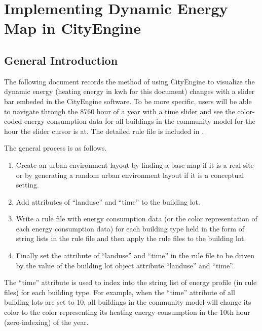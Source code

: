 \chapter{Implementing Dynamic Energy Map in
  CityEngine} %

\label{AppendixA} %

\section{General Introduction}
The following document records the method of using CityEngine to
visualize the dynamic energy (heating energy in kwh for this document)
changes with a slider bar embeded in the CityEngine software. To be
more specific, users will be able to navigate through the 8760 hour of
a year with a time slider and see the color-coded energy consumption
data for all buildings in the community model for the hour the slider
cursor is at. The detailed rule file is included in .

The general process is as follows. 
\begin{enumerate}[{Step }1]
\item Create an urban environment layout by finding a base map if it
  is a real site or by generating a random urban environment layout if
  it is a conceptual setting.
\item Add attributes of ``landuse'' and ``time'' to the building lot.
\item Write a rule file with energy consumption data (or the color
  representation of each energy consumption data) for each building
  type held in the form of string lists in the rule file and then
  apply the rule files to the building lot.
\item Finally set the attribute of ``landuse'' and ``time'' in the
  rule file to be driven by the value of the building lot object
  attribute ``landuse'' and ``time''.
\end{enumerate}
The ``time'' attribute is used to index into the string list of energy
profile (in rule files) for each building type. For example, when the
``time'' attribute of all building lots are set to 10, all buildings
in the community model will change its color to the color representing
its heating energy consumption in the 10th hour (zero-indexing) of the
year.

